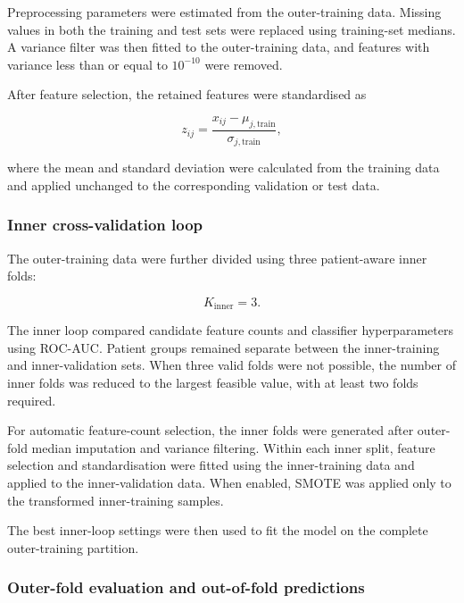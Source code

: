 \documentclass[12pt,twocolumn]{article}
\begin{document}
Preprocessing parameters were estimated from the outer-training data.
Missing values in both the training and test sets were replaced using
training-set medians. A variance filter was then fitted to the
outer-training data, and features with variance less than or equal to
\(10^{-10}\) were removed.

After feature selection, the retained features were standardised as

\begin{equation}
z_{ij}
=
\frac{x_{ij}-\mu_{j,\mathrm{train}}}
{\sigma_{j,\mathrm{train}}},
\label{eq:training_standardisation}
\end{equation}

where the mean and standard deviation were calculated from the
training data and applied unchanged to the corresponding validation or
test data.

\subsubsection{Inner cross-validation loop}
\label{subsubsec:inner_cv}

The outer-training data were further divided using three patient-aware
inner folds:

\begin{equation}
K_{\mathrm{inner}}=3.
\label{eq:inner_folds}
\end{equation}

The inner loop compared candidate feature counts and classifier
hyperparameters using ROC-AUC. Patient groups remained separate
between the inner-training and inner-validation sets. When three valid
folds were not possible, the number of inner folds was reduced to the
largest feasible value, with at least two folds required.

For automatic feature-count selection, the inner folds were generated
after outer-fold median imputation and variance filtering. Within each
inner split, feature selection and standardisation were fitted using
the inner-training data and applied to the inner-validation data. When
enabled, SMOTE was applied only to the transformed inner-training
samples.

The best inner-loop settings were then used to fit the model on the
complete outer-training partition.

\subsubsection{Outer-fold evaluation and out-of-fold predictions}
\label{subsubsec:oof_predictions}
\end{document}
